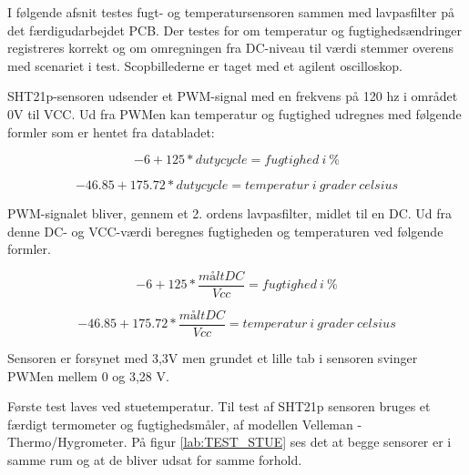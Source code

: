 

I følgende afsnit testes fugt- og temperatursensoren sammen med lavpasfilter på det færdigudarbejdet PCB. Der testes for om temperatur og fugtighedsændringer registreres korrekt og om omregningen fra DC-niveau til værdi stemmer overens med scenariet i test. Scopbillederne er taget med et agilent oscilloskop.

SHT21p-sensoren udsender et PWM-signal med en frekvens på 120 hz i området 0V til VCC. Ud fra PWMen kan temperatur og fugtighed udregnes med følgende formler som er hentet fra databladet:

\begin{equation}
-6+125*duty cycle= fugtighed \ i \ \%
\end{equation}

\begin{equation}
-46.85+175.72*duty cycle= temperatur \ i \ grader \ celsius
\end{equation}

PWM-signalet bliver, gennem et 2. ordens lavpasfilter, midlet til en DC. Ud fra denne DC-
og VCC-værdi beregnes fugtigheden og temperaturen ved følgende formler.


\begin{equation}
-6+125*\frac{målt DC}{Vcc}= fugtighed \ i \ \%
\end{equation}

\begin{equation}
-46.85+175.72*\frac{målt DC}{Vcc}=temperatur \ i \ grader \ celsius
\end{equation}

Sensoren er forsynet med 3,3V men grundet et lille tab i sensoren svinger PWMen mellem
0 og 3,28 V.




Første test laves ved stuetemperatur. Til test af SHT21p sensoren bruges et færdigt termometer og fugtighedsmåler, af modellen Velleman - Thermo/Hygrometer. På figur \ref{lab:TEST_STUE} ses det at begge sensorer er i samme rum og at de bliver udsat for samme forhold. 

